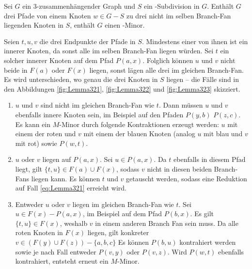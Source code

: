 \begin{lemma}\label{eq:Lemma32}
  Sei $G$ ein $3$-zusammenhängender Graph und $S$ ein \kdd-Subdivision in $G$.
  Enthält $G$ drei Pfade von einem Knoten $w \in G - S$ zu drei nicht im selben Branch-Fan liegenden Knoten in $S$, enthält $G$ einen \kf-Minor.
\end{lemma}
\begin{beweis}
  Seien $t, u, v$ die drei Endpunkte der Pfade in $S$.
  Mindestens einer von ihnen ist ein innerer Knoten, da sonst alle im selben Branch-Fan liegen würden.
  Sei \oBdA $t$ ein solcher innerer Knoten auf dem Pfad $P(a, x)$.
  Folglich können $u$ und $v$ nicht beide in $F(a)$ oder $F(x)$ liegen, sonst lägen alle drei im gleichen Branch-Fan.
  Es wird unterschieden, wo genau die drei Knoten in $S$ liegen -- die Fälle sind in den Abbildungen \ref{fig:Lemma321}, \ref{fig:Lemma322} und \ref{fig:Lemma323} skizziert.
  \begin{enumerate}
    \item $u$ und $v$ sind nicht im gleichen Branch-Fan wie $t$. \label{eq:Lemma321}
          Dann müssen $u$ und $v$ ebenfalls innere Knoten sein, im Beispiel auf den Pfaden $P(y, b)$ \bzw $P(z, c)$.
          Es kann ein $M$-Minor durch folgende Kontraktionen erzeugt werden: $u$ mit einem der roten und $v$ mit einem der blauen Knoten (analog $u$ mit blau und $v$ mit rot) sowie $P(w, t)$.
    \item $u$ oder $v$ liegen auf $P(a, x)$. \label{eq:Lemma322}
          Sei \oBdA $u \in P(a, x)$.
          Da $t$ ebenfalls in diesem Pfad liegt, gilt $\{t, u\} \in F(a) \cup F(x)$, sodass $v$ nicht in diesen beiden Branch-Fans liegen kann.
          Es können $t$ und $v$ getauscht werden, sodass eine Reduktion auf Fall \ref{eq:Lemma321} erreicht wird.
    \item Entweder $u$ oder $v$ liegen im gleichen Branch-Fan wie $t$. \label{eq:Lemma323}
          Sei \oBdA $u \in F(x) - P(a, x)$, im Beispiel auf dem Pfad $P(b, x)$.
          Es gilt $\{t, u\} \in F(x)$, weshalb $v$ in einem anderen Branch Fan sein muss.
          Da alle roten Knoten in $F(x)$ liegen, gilt konkreter $v \in (F(y) \cup F(z)) - \{a, b, c\}$
          Es können $P(b, u)$ kontrahiert werden sowie je nach Fall entweder $P(v, y)$ oder $P(v, z)$.
          Wird $P(w, t)$ ebenfalls kontrahiert, entsteht erneut ein $M$-Minor.
  \end{enumerate}
\end{beweis}
